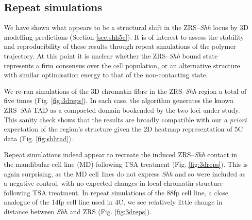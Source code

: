 \documentclass[a4paper,11pt,oneside]{book}
\begin{document}
\subsection{Repeat simulations}

We have shown what appears to be a structural shift in the ZRS--\emph{Shh} locus by 3D modelling predictions (Section \ref{sec:shh5c}). It is of interest to assess the stability and reproducibility of these results through repeat simulations of the polymer trajectory. At this point it is unclear whether the ZRS--\emph{Shh} bound state represents a firm consensus over the cell population, or an alternative structure with similar optimisation energy to that of the non-contacting state. 


We re-ran simulations of the 3D chromatin fibre in the ZRS--\emph{Shh} region a total of five times (Fig. \ref{fig:3dreps}). In each case, the algorithm generates the known ZRS--\emph{Shh} TAD as a compacted domain bookended by the two loci under study. This sanity check shows that the results are broadly compatible with our \emph{a priori} expectation of the region's structure given the 2D heatmap representation of 5C data (Fig. \ref{fig:shhtad}).

Repeat simulations indeed appear to recreate the induced ZRS--\emph{Shh} contact in the mandibular cell line (MD) following TSA treatment (Fig. \ref{fig:3dreps}). This is again surprising, as the MD cell lines do not express \emph{Shh} and so were included as a negative control, with no expected changes in local chromatin structure following TSA treatment. In repeat simulations of the 88fp cell line, a close analogue of the 14fp cell line used in 4C, we see relatively little change in distance between \emph{Shh} and ZRS (Fig. \ref{fig:3dreps}). 
\end{document}
